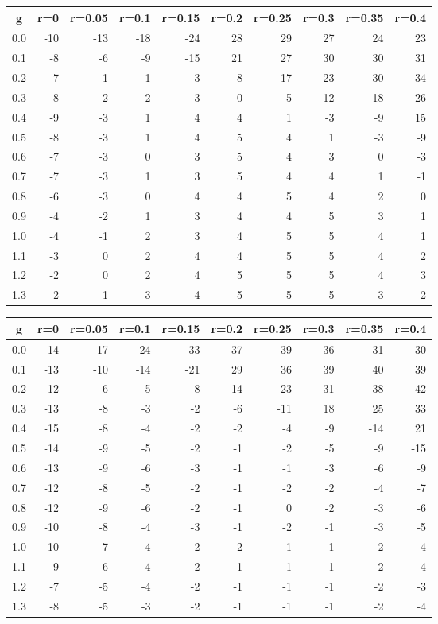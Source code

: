 %
\begin{table}[!tbp]
 \begin{center}
 \begin{tabular}{rrrrrrrrrr}\hline\hline
\multicolumn{1}{c}{g}&\multicolumn{1}{c}{r=0}&\multicolumn{1}{c}{r=0.05}&\multicolumn{1}{c}{r=0.1}&\multicolumn{1}{c}{r=0.15}&\multicolumn{1}{c}{r=0.2}&\multicolumn{1}{c}{r=0.25}&\multicolumn{1}{c}{r=0.3}&\multicolumn{1}{c}{r=0.35}&\multicolumn{1}{c}{r=0.4}\tabularnewline
\hline
0.0&-10&-13&-18&-24&28&29&27&24&23\tabularnewline
0.1& -8& -6& -9&-15&21&27&30&30&31\tabularnewline
0.2& -7& -1& -1& -3&-8&17&23&30&34\tabularnewline
0.3& -8& -2&  2&  3& 0&-5&12&18&26\tabularnewline
0.4& -9& -3&  1&  4& 4& 1&-3&-9&15\tabularnewline
0.5& -8& -3&  1&  4& 5& 4& 1&-3&-9\tabularnewline
0.6& -7& -3&  0&  3& 5& 4& 3& 0&-3\tabularnewline
0.7& -7& -3&  1&  3& 5& 4& 4& 1&-1\tabularnewline
0.8& -6& -3&  0&  4& 4& 5& 4& 2& 0\tabularnewline
0.9& -4& -2&  1&  3& 4& 4& 5& 3& 1\tabularnewline
1.0& -4& -1&  2&  3& 4& 5& 5& 4& 1\tabularnewline
1.1& -3&  0&  2&  4& 4& 5& 5& 4& 2\tabularnewline
1.2& -2&  0&  2&  4& 5& 5& 5& 4& 3\tabularnewline
1.3& -2&  1&  3&  4& 5& 5& 5& 3& 2\tabularnewline
\hline
\end{tabular}

\end{center}

\end{table}

%
\begin{table}[!tbp]
 \begin{center}
 \begin{tabular}{rrrrrrrrrr}\hline\hline
\multicolumn{1}{c}{g}&\multicolumn{1}{c}{r=0}&\multicolumn{1}{c}{r=0.05}&\multicolumn{1}{c}{r=0.1}&\multicolumn{1}{c}{r=0.15}&\multicolumn{1}{c}{r=0.2}&\multicolumn{1}{c}{r=0.25}&\multicolumn{1}{c}{r=0.3}&\multicolumn{1}{c}{r=0.35}&\multicolumn{1}{c}{r=0.4}\tabularnewline
\hline
0.0&-14&-17&-24&-33& 37& 39&36& 31& 30\tabularnewline
0.1&-13&-10&-14&-21& 29& 36&39& 40& 39\tabularnewline
0.2&-12& -6& -5& -8&-14& 23&31& 38& 42\tabularnewline
0.3&-13& -8& -3& -2& -6&-11&18& 25& 33\tabularnewline
0.4&-15& -8& -4& -2& -2& -4&-9&-14& 21\tabularnewline
0.5&-14& -9& -5& -2& -1& -2&-5& -9&-15\tabularnewline
0.6&-13& -9& -6& -3& -1& -1&-3& -6& -9\tabularnewline
0.7&-12& -8& -5& -2& -1& -2&-2& -4& -7\tabularnewline
0.8&-12& -9& -6& -2& -1&  0&-2& -3& -6\tabularnewline
0.9&-10& -8& -4& -3& -1& -2&-1& -3& -5\tabularnewline
1.0&-10& -7& -4& -2& -2& -1&-1& -2& -4\tabularnewline
1.1& -9& -6& -4& -2& -1& -1&-1& -2& -4\tabularnewline
1.2& -7& -5& -4& -2& -1& -1&-1& -2& -3\tabularnewline
1.3& -8& -5& -3& -2& -1& -1&-1& -2& -4\tabularnewline
\hline
\end{tabular}

\end{center}

\end{table}

